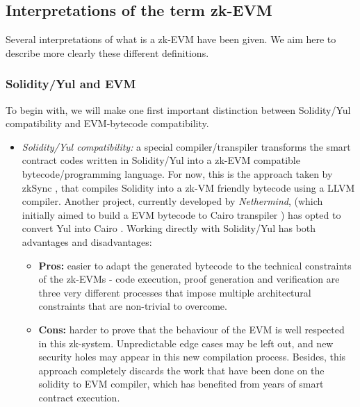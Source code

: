 \subsection{Interpretations of the term zk-EVM}
Several interpretations of what is a zk-EVM have been given. We aim here to describe more clearly these different definitions. 

\subsubsection{Solidity/Yul and EVM}
To begin with, we will make one first important distinction between Solidity/Yul compatibility and EVM-bytecode compatibility.
\begin{itemize}
    \item \textit{Solidity/Yul compatibility:} a special compiler/transpiler transforms the smart contract codes written in Solidity/Yul into a zk-EVM compatible bytecode/programming language. For now, this is the approach taken by zkSync  \cite{mediumZKEVM, zksynczkEVM}, that compiles Solidity into a zk-VM friendly bytecode using a LLVM compiler. Another project, currently developed by \textit{Nethermind}, (which initially aimed to build a EVM bytecode to Cairo transpiler \cite{nethermindEvmCairo}) has opted to convert Yul into Cairo \cite{nethermindSolCairo}. Working directly with Solidity/Yul has both advantages and disadvantages: 
    \begin{itemize}
        \item \textbf{Pros:} easier to adapt the generated bytecode to the technical constraints of the zk-EVMs - code execution, proof generation and verification are three very different processes that impose multiple architectural constraints that are non-trivial to overcome. 
        \item \textbf{Cons:} harder to prove that the behaviour of the EVM is well respected in this zk-system. Unpredictable edge cases may be left out, and new security holes may appear in this new compilation process. Besides, this approach completely discards the work that have been done on the solidity to EVM compiler, which has benefited from years of smart contract execution.
    \end{itemize}
    

\end{itemize}

